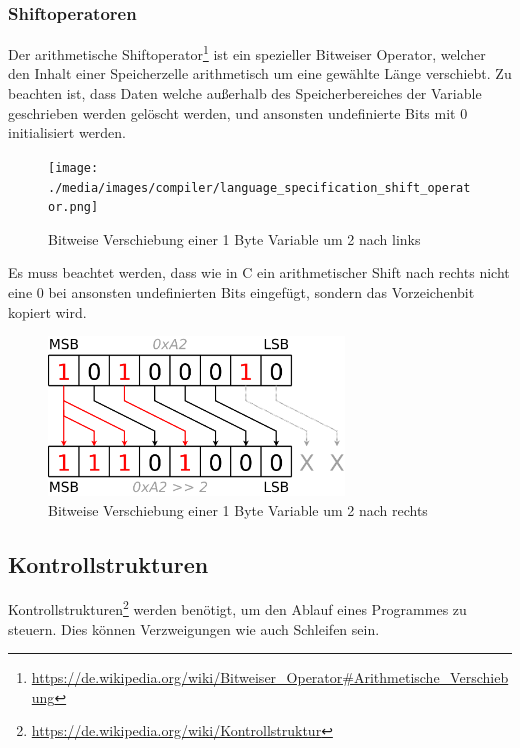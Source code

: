 \newpage
\subsubsection{Shiftoperatoren}

Der arithmetische Shiftoperator\footnote{\url{https://de.wikipedia.org/wiki/Bitweiser_Operator\#Arithmetische_Verschiebung}} ist ein spezieller Bitweiser Operator, welcher den Inhalt einer Speicherzelle arithmetisch um eine gew\"ahlte L\"ange verschiebt. Zu beachten ist, dass Daten welche außerhalb des Speicherbereiches der Variable geschrieben werden gel\"oscht werden, und ansonsten undefinierte Bits mit 0 initialisiert werden.

\begin{figure}[h]
\centering
\texttt{[image: ./media/images/compiler/language\_specification\_shift\_operator.png]}
\caption{Bitweise Verschiebung einer 1 Byte Variable um 2 nach links}
\label{language_specification_shift_operator}
\end{figure}

Es muss beachtet werden, dass wie in C ein arithmetischer Shift nach rechts nicht eine 0 bei ansonsten undefinierten Bits eingef\"ugt, sondern das Vorzeichenbit kopiert wird.

\begin{figure}[h]
\centering
\includegraphics[width=0.7\textwidth]{./media/images/compiler/language_specification_shift_operator_right.png}
\caption{Bitweise Verschiebung einer 1 Byte Variable um 2 nach rechts}
\label{language_specification_shift_operator_right}
\end{figure}

\newpage
\subsection{Kontrollstrukturen}

Kontrollstrukturen\footnote{\url{https://de.wikipedia.org/wiki/Kontrollstruktur} } werden ben\"otigt, um den Ablauf eines Programmes zu steuern. Dies k\"onnen Verzweigungen wie auch Schleifen sein.

